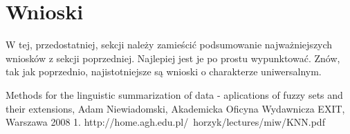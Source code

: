 \documentclass{classrep}
\begin{document}
	\section{Wnioski}
	{\color{blue}W tej, przedostatniej, sekcji należy zamieścić podsumowanie
		najważniejszych wniosków z sekcji poprzedniej. Najlepiej jest je po prostu
		wypunktować. Znów, tak jak poprzednio, najistotniejsze są wnioski o
		charakterze uniwersalnym.}
	
	
	\begin{thebibliography}{}
		Methods for the linguistic summarization of data - aplications of fuzzy sets and their extensions, Adam Niewiadomski, Akademicka Oficyna Wydawnicza EXIT, Warszawa 2008
		1. http://home.agh.edu.pl/~horzyk/lectures/miw/KNN.pdf
	\end{thebibliography}
\end{document}
